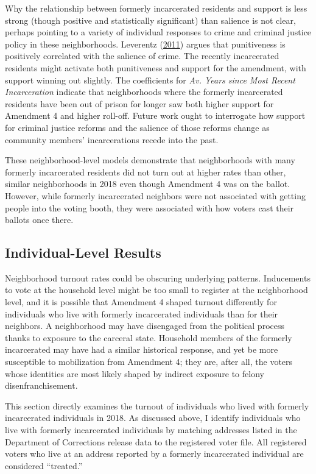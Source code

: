 \documentclass[
  12pt,
]{article}
\begin{document}
Why the relationship between formerly incarcerated residents and support is less strong (though positive and statistically significant) than salience is not clear, perhaps pointing to a variety of individual responses to crime and criminal justice policy in these neighborhoods. Leverentz (\protect\hyperlink{ref-Leverentz2011}{2011}) argues that punitiveness is positively correlated with the salience of crime. The recently incarcerated residents might activate both punitiveness and support for the amendment, with support winning out slightly. The coefficients for \emph{Av. Years since Most Recent Incarceration} indicate that neighborhoods where the formerly incarcerated residents have been out of prison for longer saw both higher support for Amendment 4 and higher roll-off. Future work ought to interrogate how support for criminal justice reforms and the salience of those reforms change as community members' incarcerations recede into the past.

These neighborhood-level models demonstrate that neighborhoods with many formerly incarcerated residents did not turn out at higher rates than other, similar neighborhoods in 2018 even though Amendment 4 was on the ballot. However, while formerly incarcerated neighbors were not associated with getting people into the voting booth, they were associated with how voters cast their ballots once there.

\hypertarget{individual-level-results}{%
\subsection*{Individual-Level Results}\label{individual-level-results}}

Neighborhood turnout rates could be obscuring underlying patterns. Inducements to vote at the household level might be too small to register at the neighborhood level, and it is possible that Amendment 4 shaped turnout differently for individuals who live with formerly incarcerated individuals than for their neighbors. A neighborhood may have disengaged from the political process thanks to exposure to the carceral state. Household members of the formerly incarcerated may have had a similar historical response, and yet be more susceptible to mobilization from Amendment 4; they are, after all, the voters whose identities are most likely shaped by indirect exposure to felony disenfranchisement.

This section directly examines the turnout of individuals who lived with formerly incarcerated individuals in 2018. As discussed above, I identify individuals who live with formerly incarcerated individuals by matching addresses listed in the Department of Corrections release data to the registered voter file. All registered voters who live at an address reported by a formerly incarcerated individual are considered ``treated.''
\end{document}
